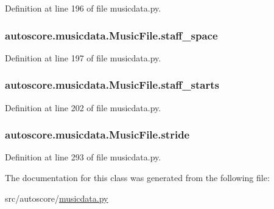 Definition at line 196 of file musicdata.\+py.

\subsubsection[{\texorpdfstring{staff\+\_\+space}{staff_space}}]{\setlength{\rightskip}{0pt plus 5cm}autoscore.\+musicdata.\+Music\+File.\+staff\+\_\+space}\hypertarget{classautoscore_1_1musicdata_1_1MusicFile_ae6bac1c7525ccf4708542f1af914361f}{}\label{classautoscore_1_1musicdata_1_1MusicFile_ae6bac1c7525ccf4708542f1af914361f}


Definition at line 197 of file musicdata.\+py.

\subsubsection[{\texorpdfstring{staff\+\_\+starts}{staff_starts}}]{\setlength{\rightskip}{0pt plus 5cm}autoscore.\+musicdata.\+Music\+File.\+staff\+\_\+starts}\hypertarget{classautoscore_1_1musicdata_1_1MusicFile_a493bbcf3119052c610c6cf7bc4862865}{}\label{classautoscore_1_1musicdata_1_1MusicFile_a493bbcf3119052c610c6cf7bc4862865}


Definition at line 202 of file musicdata.\+py.

\subsubsection[{\texorpdfstring{stride}{stride}}]{\setlength{\rightskip}{0pt plus 5cm}autoscore.\+musicdata.\+Music\+File.\+stride}\hypertarget{classautoscore_1_1musicdata_1_1MusicFile_af035776b1244fa7a1492a0d5ccf60834}{}\label{classautoscore_1_1musicdata_1_1MusicFile_af035776b1244fa7a1492a0d5ccf60834}


Definition at line 293 of file musicdata.\+py.



The documentation for this class was generated from the following file\+:\begin{DoxyCompactItemize}
\item 
src/autoscore/\hyperlink{musicdata_8py}{musicdata.\+py}\end{DoxyCompactItemize}
